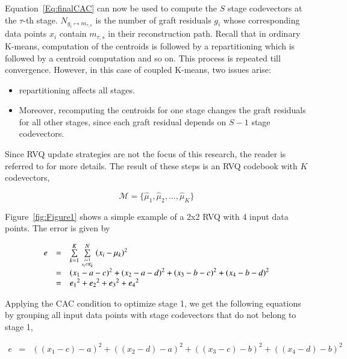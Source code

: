 Equation~\ref{Eq:finalCAC} can now be used to compute the $S$ stage codevectors at the $\tau$-th stage.  $N_{g_i \mapsto m_{\tau, s}}$ is the number of graft residuals $g_i$ whose corresponding data points $x_i$ contain $m_{\tau, s}$ in their reconstruction path.  Recall that in ordinary K-means, computation of the centroids is followed by a repartitioning which is followed by a centroid computation and so on.  This process is repeated till convergence.  However, in this case of coupled K-means, two issues arise:

\begin{itemize}
\item repartitioning affects all stages.  
\item Moreover, recomputing the centroids for one stage changes the graft residuals for all other stages, since each graft residual depends on $S-1$ stage codevectors.  
\end{itemize}

Since RVQ update strategies are not the focus of this research, the reader is referred to  \cite{1996_JNL_AdvancesRVQ_Barnes} for more details.  The result of these steps is an RVQ codebook with $K$ codevectors,

\begin{equation}
\mathcal{M} = \{\hat{\mu}_1, \hat{\mu}_2, \ldots, \hat{\mu}_K\}
\end{equation}

Figure~\ref{fig:Figure1} shows a simple example of a 2x2 RVQ with 4 input data points.  The error is given by



\begin{equation}
\begin{array}{lllll}
e &=& \sum\limits_{k=1}^K \sum\limits_{{i=1 \atop x_i \in \mathcal{K}_k}}^N {(x_i - \mu_k)}^2 \\
&=& {(x_1 - a - c)}^2 + {(x_2- a - d)}^2 + {(x_3 - b - c)}^2 + {(x_4 - b - d)}^2\\
&=& {e_1}^2 + {e_2}^2 + {e_3}^2 + {e_4}^2
\end{array}
\end{equation}

Applying the CAC condition to optimize stage 1, we get the following equations by grouping all input data points with stage codevectors that do not belong to stage 1,

\begin{equation}
\begin{array}{lllll}
e &=& {((x_1 - c) - a)}^2 + {((x_2- d) - a)}^2 + {((x_3 - c) - b)}^2 + {((x_4 - d) - b)}^2
\end{array}
\label{Eqn:2x2RVQ_stage1}
\end{equation}


